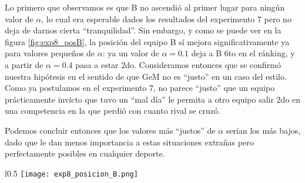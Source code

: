 \begin{LaTeXdescription}
    \item[Resultados, an\'alisis y discusi\'on] Lo primero que observamos es que B no ascendió al primer lugar para ningún valor de $\alpha$, lo cual era esperable dados los resultados del experimento 7 pero no deja de darnos cierta ``tranquilidad''. Sin embargo, y como se puede ver en la figura \ref{fig:exp8_posB}, la posición del equipo B sí mejora significativamente ya para valores pequeños de $\alpha$: ya un valor de $\alpha = 0.1$ deja a B 6to en el ránking, y a partir de $\alpha = 0.4$ pasa a estar 2do. Consideramos entonces que se confirmó nuestra hipótesis en el sentido de que GeM no es ``justo'' en un caso del estilo. Como ya postulamos en el experimento 7, no parece ``justo'' que un equipo prácticamente invicto que tuvo un ``mal día'' le permita a otro equipo salir 2do en una competencia en la que perdió con cuanto rival se cruzó.
    
    Podemos concluir entonces que los valores más ``justos'' de $\alpha$ serían los más bajos, dado que le dan menos importancia a estas situaciones extrañas pero perfectamente posibles en cualquier deporte.
    
\end{LaTeXdescription}

\begin{wrapfigure}{l}{0.5\textwidth}
    \texttt{[image: exp8\_posicion\_B.png]}
    \caption{Posici\'on del equipo B en el ranking en funci\'on del factor
        $\alpha$ ($c=\alpha$)}
    \label{fig:exp8_posB}
\end{wrapfigure}
\noindent
